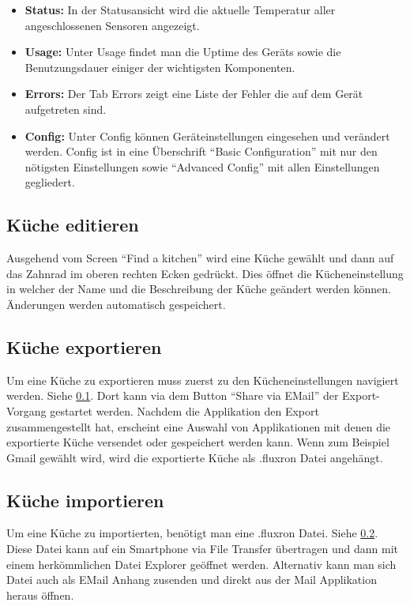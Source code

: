 \begin{itemize}
\item \textbf{Status:}
In der Statusansicht wird die aktuelle Temperatur aller angeschlossenen Sensoren angezeigt. \\
\item \textbf{Usage:}
Unter Usage findet man die Uptime des Geräts sowie die Benutzungsdauer einiger der wichtigsten Komponenten. \\

\item \textbf{Errors:}
Der Tab Errors zeigt eine Liste der Fehler die auf dem Gerät aufgetreten sind. \\

\item \textbf{Config:}
Unter Config können Geräteinstellungen eingesehen und verändert werden. Config ist in eine Überschrift \enquote{Basic Configuration} mit nur den nötigsten Einstellungen sowie \enquote{Advanced Config} mit allen Einstellungen gegliedert.
\end{itemize}

\WFclear
\subsection{Küche editieren}
\label{subsec:kuecheEditieren}
Ausgehend vom Screen \enquote{Find a kitchen} wird eine Küche gewählt und dann auf das Zahnrad im oberen rechten Ecken gedrückt. Dies öffnet die Kücheneinstellung in welcher der Name und die Beschreibung der Küche geändert werden können. Änderungen werden automatisch gespeichert.

\subsection{Küche exportieren}
\label{subsec:kuecheExportieren}
Um eine Küche zu exportieren muss zuerst zu den Kücheneinstellungen navigiert werden. Siehe \ref{subsec:kuecheEditieren}. Dort kann via dem Button \enquote{Share via EMail} der Export-Vorgang gestartet werden. Nachdem die Applikation den Export zusammengestellt hat, erscheint eine Auswahl von Applikationen mit denen die exportierte Küche versendet oder gespeichert werden kann. Wenn zum Beispiel Gmail gewählt wird, wird die exportierte Küche als .fluxron Datei angehängt. 

\subsection{Küche importieren}
Um eine Küche zu importierten, benötigt man eine .fluxron Datei. Siehe \ref{subsec:kuecheExportieren}. Diese Datei kann auf ein Smartphone via File Transfer übertragen und dann mit einem herkömmlichen Datei Explorer geöffnet werden. Alternativ kann man sich Datei auch als EMail Anhang zusenden und direkt aus der Mail Applikation heraus öffnen.

